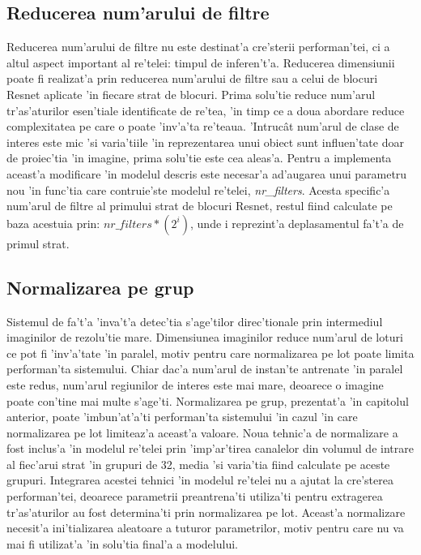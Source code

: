 \documentclass[12pt,a4paper,twoside]{report}
\begin{document}
\subsection{Reducerea num'arului de filtre}
Reducerea num'arului de filtre nu este destinat'a cre'sterii performan'tei, ci a altul aspect important al re'telei: timpul de inferen't'a. Reducerea dimensiunii poate fi realizat'a prin reducerea num'arului de filtre sau a celui de blocuri Resnet aplicate 'in fiecare strat de blocuri. Prima solu'tie reduce num'arul tr'as'aturilor esen'tiale identificate de re'tea, 'in timp ce a doua abordare reduce complexitatea pe care o poate 'inv'a'ta re'teaua. 'Intruc\^at num'arul de clase de interes este mic 'si varia'tiile 'in reprezentarea unui obiect sunt influen'tate doar de proiec'tia 'in imagine, prima solu'tie este cea aleas'a. Pentru a implementa aceast'a modificare 'in modelul descris este necesar'a ad'augarea unui parametru nou 'in func'tia care contruie'ste modelul re'telei, \textit{nr\_filters}. Acesta specific'a num'arul de filtre al primului strat de blocuri Resnet, restul fiind calculate pe baza acestuia prin: $nr\_filters * (2^i)$, unde i reprezint'a deplasamentul fa't'a de primul strat.

\subsection{Normalizarea pe grup}
Sistemul de fa't'a 'inva't'a detec'tia s'age'tilor direc'tionale prin intermediul imaginilor de rezolu'tie mare. Dimensiunea imaginilor reduce num'arul de loturi ce pot fi 'inv'a'tate 'in paralel, motiv pentru care normalizarea pe lot poate limita performan'ta sistemului. Chiar dac'a num'arul de instan'te antrenate 'in paralel este redus, num'arul regiunilor de interes este mai mare, deoarece o imagine poate con'tine mai multe s'age'ti. Normalizarea pe grup, prezentat'a 'in capitolul anterior, poate 'imbun'at'a'ti performan'ta sistemului 'in cazul 'in care normalizarea pe lot limiteaz'a aceast'a valoare. Noua tehnic'a de normalizare a fost inclus'a 'in modelul re'telei prin 'imp'ar'tirea canalelor din volumul de intrare al fiec'arui strat 'in grupuri de 32, media 'si varia'tia fiind calculate pe aceste grupuri. Integrarea acestei tehnici 'in modelul re'telei nu a ajutat la cre'sterea performan'tei, deoarece parametrii preantrena'ti utiliza'ti pentru extragerea tr'as'aturilor au fost determina'ti prin normalizarea pe lot. Aceast'a normalizare necesit'a ini'tializarea aleatoare a tuturor parametrilor, motiv pentru care nu va mai fi utilizat'a 'in solu'tia final'a a modelului.
\end{document}
